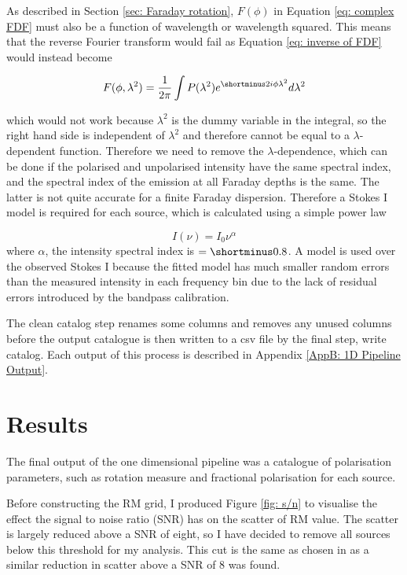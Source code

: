 As described in Section \ref{sec: Faraday rotation}, $F(\phi)$ in Equation \ref{eq: complex FDF} must also be a function of wavelength or wavelength squared. This means that the reverse Fourier transform would fail as Equation \ref{eq: inverse of FDF} would instead become 

\begin{equation}
    F(\phi, \lambda^2) = \frac{1}{2\pi} \int P(\lambda^2)e^{\shortminus2i\phi\lambda^2}d\lambda^2
    \label{eq: failed FT}
\end{equation}

which would not work because $\lambda^2$ is the dummy variable in the integral, so the right hand side is independent of $\lambda^2$ and therefore cannot be equal to a $\lambda$-dependent function. Therefore we need to remove the $\lambda$-dependence, which can be done if the polarised and unpolarised intensity have the same spectral index, and the spectral index of the emission at all Faraday depths is the same. The latter is not quite accurate for a finite Faraday dispersion. Therefore a Stokes I model is required for each source, which is calculated using a simple power law 

\begin{equation}
    I(\nu) = I_0 \nu^{\alpha}
    \label{eq: spectral index}
\end{equation}
where $\alpha$, the intensity spectral index is $=\shortminus0.8$. A model is used over the observed Stokes I because the fitted model has much smaller random errors than the measured intensity in each frequency bin due to the lack of residual errors introduced by the bandpass calibration. 

The clean catalog step renames some columns and removes any unused columns before the output catalogue is then written to a csv file by the final step, write catalog. Each output of this process is described in Appendix \ref{AppB: 1D Pipeline Output}.


\section{Results}

The final output of the one dimensional pipeline was a catalogue of polarisation parameters, such as rotation measure and fractional polarisation for each source. 

Before constructing the RM grid, I produced Figure \ref{fig: s/n} to visualise the effect the signal to noise ratio (SNR) has on the scatter of RM value. The scatter is largely reduced above a SNR of eight, so I have decided to remove all sources below this threshold for my analysis. This cut is the same as chosen in \cite{vanderwoude2024prototypefaradayrotationmeasure} as a similar reduction in scatter above a SNR of 8 was found.

